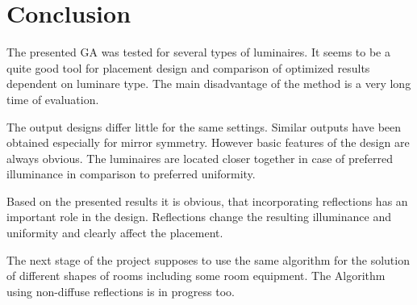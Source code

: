 \section{Conclusion}

The presented GA was tested for several types of luminaires. It seems to be a quite good tool for placement design and comparison of optimized results dependent on luminare type. The main disadvantage of the method is a very long time of evaluation.

The output designs differ little for the same settings. Similar outputs have been obtained especially for mirror symmetry. However basic features of the design are always obvious. The luminaires are located closer together in case of preferred illuminance in comparison to preferred uniformity.

Based on the presented results it is obvious, that incorporating reflections has an important role in the design. Reflections change the resulting illuminance and uniformity and clearly affect the placement.

The next stage of the project supposes to use the same algorithm for the solution of different shapes of rooms including some room equipment. The Algorithm using non-diffuse reflections is in progress too.